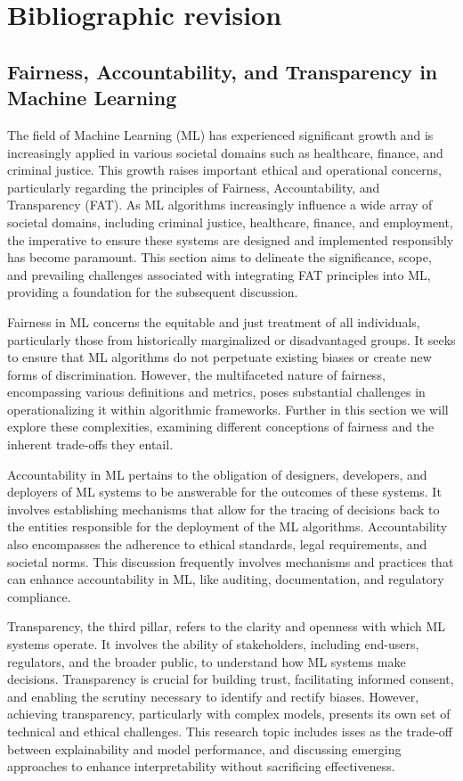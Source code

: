 
\chapter{Bibliographic revision}

\section{Fairness, Accountability, and Transparency in Machine Learning}

The field of Machine Learning (ML) has experienced significant growth and is increasingly applied in various societal domains such as healthcare, finance, and criminal justice. This growth raises important ethical and operational concerns, particularly regarding the principles of Fairness, Accountability, and Transparency (FAT). As ML algorithms increasingly influence a wide array of societal domains, including criminal justice, healthcare, finance, and employment, the imperative to ensure these systems are designed and implemented responsibly has become paramount. This section aims to delineate the significance, scope, and prevailing challenges associated with integrating FAT principles into ML, providing a foundation for the subsequent discussion.

Fairness in ML concerns the equitable and just treatment of all individuals, particularly those from historically marginalized or disadvantaged groups. It seeks to ensure that ML algorithms do not perpetuate existing biases or create new forms of discrimination. However, the multifaceted nature of fairness, encompassing various definitions and metrics, poses substantial challenges in operationalizing it within algorithmic frameworks. Further in this section we will explore these complexities, examining different conceptions of fairness and the inherent trade-offs they entail.

Accountability in ML pertains to the obligation of designers, developers, and deployers of ML systems to be answerable for the outcomes of these systems. It involves establishing mechanisms that allow for the tracing of decisions back to the entities responsible for the deployment of the ML algorithms. Accountability also encompasses the adherence to ethical standards, legal requirements, and societal norms. This discussion frequently involves mechanisms and practices that can enhance accountability in ML, like auditing, documentation, and regulatory compliance.

Transparency, the third pillar, refers to the clarity and openness with which ML systems operate. It involves the ability of stakeholders, including end-users, regulators, and the broader public, to understand how ML systems make decisions. Transparency is crucial for building trust, facilitating informed consent, and enabling the scrutiny necessary to identify and rectify biases. However, achieving transparency, particularly with complex models, presents its own set of technical and ethical challenges. This research topic includes isses as the trade-off between explainability and model performance, and discussing emerging approaches to enhance interpretability without sacrificing effectiveness.

